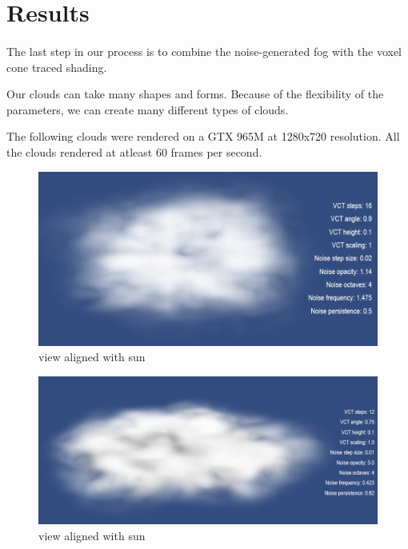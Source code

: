 \newpage
\section{Results}\paragraph{}
The last step in our process is to combine the noise-generated fog with the voxel cone traced shading.

Our clouds can take many shapes and forms. Because of the flexibility of the parameters, we can create many different types of clouds.

The following clouds were rendered on a GTX 965M at 1280x720 resolution. All the clouds rendered at atleast 60 frames per second.

\begin{figure}[h]
\centering
\includegraphics[width=\textwidth]{../res/res2.png}
\caption{view aligned with sun}
\end{figure}

\begin{figure}[h]
\centering
\includegraphics[width=\textwidth]{../res/res4.png}
\caption{view aligned with sun}
\end{figure}

